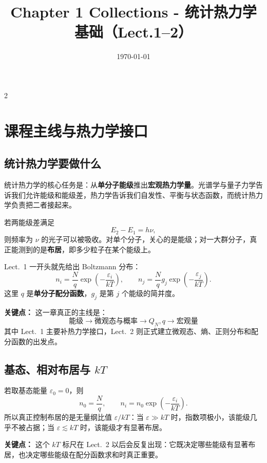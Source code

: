 \documentclass[a4paper,9pt]{article}
\title{\vspace{-2em}\Large\bfseries\color{sectioncolor} Chapter 1 Collections - 统计热力学基础（Lect.1--2）\vspace{-1em}}
\author{}
\date{\today}
\newenvironment{keypoint}
{\par\vspace{0.3em}\noindent\begin{tcolorbox}[
  colback=keybg,
  colframe=keycolor,
  boxrule=0.5pt,
  arc=2pt,
  left=2pt,
  right=2pt,
  top=2pt,
  bottom=2pt,
  boxsep=0pt,
  ]
\noindent\textcolor{keycolor}{\textbf{关键点：}}}
{\end{tcolorbox}\par\vspace{0.3em}}
\begin{document}
\maketitle
\thispagestyle{fancy}

\begin{multicols}{2}

	\scriptsize{\tableofcontents}

	\section{课程主线与热力学接口}

	\subsection{统计热力学要做什么}
	统计热力学的核心任务是：从\textbf{单分子能级}推出\textbf{宏观热力学量}。光谱学与量子力学告诉我们允许能级和能级差，热力学告诉我们自发性、平衡与状态函数，而统计热力学负责把二者接起来。

	若两能级差满足
	\[
		E_2-E_1=h\nu,
	\]
	则频率为 $\nu$ 的光子可以被吸收。对单个分子，关心的是能级；对一大群分子，真正能测到的是\textbf{布居}，即多少粒子在某个能级上。

	Lect.~1 一开头就先给出 Boltzmann 分布：
	\[
		n_i=\frac{N}{q}\exp\!\left(-\frac{\varepsilon_i}{kT}\right),
		\qquad
		n_j=\frac{N}{q}g_j\exp\!\left(-\frac{\varepsilon_j}{kT}\right).
	\]
	这里 $q$ 是\textbf{单分子配分函数}，$g_j$ 是第 $j$ 个能级的简并度。

	\begin{keypoint}
		这一章真正的主线是：
		\[
			\text{能级} \longrightarrow \text{微观态与概率} \longrightarrow Q_N,q \longrightarrow \text{宏观量}
		\]
		其中 Lect.~1 主要补热力学接口，Lect.~2 则正式建立微观态、熵、正则分布和配分函数的出发点。
	\end{keypoint}

	\subsection{基态、相对布居与 $kT$}
	若取基态能量 $\varepsilon_0=0$，则
	\[
		n_0=\frac{N}{q},
		\qquad
		n_i=n_0\exp\!\left(-\frac{\varepsilon_i}{kT}\right).
	\]
	所以真正控制布居的是无量纲比值 $\varepsilon/kT$：当 $\varepsilon\gg kT$ 时，指数项极小，该能级几乎不被占据；当 $\varepsilon\lesssim kT$ 时，该能级才有显著布居。

	\begin{keypoint}
		这个 $kT$ 标尺在 Lect.~2 以后会反复出现：它既决定哪些能级有显著布居，也决定哪些能级在配分函数求和时真正重要。
	\end{keypoint}


\end{multicols}
\end{document}
